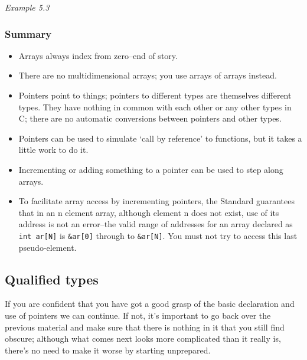     \begin{center}\textit{Example 5.3}\end{center}


   \subsubsection{Summary}
    \begin{itemize}
     \item Arrays always index from zero--end of story.

     \item There are no multidimensional arrays; you use arrays of arrays
      instead.

     \item Pointers point to things; pointers to different types are
      themselves different types. They have nothing in common with each
      other or any other types in C; there are no automatic conversions
      between pointers and other types.

     \item Pointers can be used to simulate `call by reference' to
      functions, but it takes a little work to do it.

     \item Incrementing or adding something to a pointer can be used to step
      along arrays.

     \item To facilitate array access by incrementing pointers, the Standard
      guarantees that in an n element array, although element
      n does not exist, use of its address is not an
      error--the valid range of addresses for an array declared as
      \texttt{int ar[N]} is \texttt{\&ar[0]} through to
      \texttt{\&ar[N]}. You must not try to access this last
      pseudo-element.
    \end{itemize}
   

  

  \subsection{Qualified types}\label{subsec:qualTypes}
   

   If you are confident that you have got a good grasp of the basic
    declaration and use of pointers we can continue. If not, it's important
    to go back over the previous material and make sure that there is
    nothing in it that you still find obscure; although what comes next
    looks more complicated than it really is, there's no need to make it
    worse by starting unprepared.


